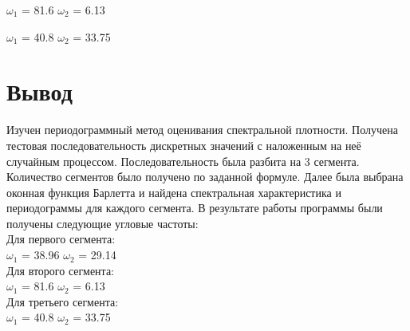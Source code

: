 \documentclass[12pt]{article}
\begin{document}
$\omega_1$ = 81.6
$\omega_2$ = 6.13

$\omega_1$ = 40.8   
$\omega_2$ = 33.75

\section{Вывод}
Изучен периодограммный метод оценивания спектральной плотности. Получена тестовая последовательность дискретных значений с наложенным на неё случайным процессом. Последовательность была разбита на 3 сегмента. Количество сегментов было получено по заданной формуле. Далее была выбрана оконная функция Барлетта и найдена спектральная характеристика и периодограммы для каждого сегмента.
В результате работы программы были получены следующие угловые частоты:\\

Для первого сегмента:\\
$\omega_1$ = 38.96  
$\omega_2$ = 29.14\\

Для второго сегмента:\\
$\omega_1$ = 81.6
$\omega_2$ = 6.13\\

Для третьего сегмента:\\
$\omega_1$ = 40.8   
$\omega_2$ = 33.75
\end{document}

